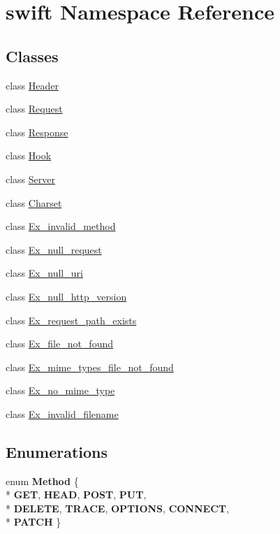 \hypertarget{namespaceswift}{\section{swift Namespace Reference}
\label{namespaceswift}
}
\subsection*{Classes}
\begin{DoxyCompactItemize}
\item 
class \hyperlink{classswift_1_1_header}{Header}
\item 
class \hyperlink{classswift_1_1_request}{Request}
\item 
class \hyperlink{classswift_1_1_response}{Response}
\item 
class \hyperlink{classswift_1_1_hook}{Hook}
\item 
class \hyperlink{classswift_1_1_server}{Server}
\item 
class \hyperlink{classswift_1_1_charset}{Charset}
\item 
class \hyperlink{classswift_1_1_ex__invalid__method}{Ex\-\_\-invalid\-\_\-method}
\item 
class \hyperlink{classswift_1_1_ex__null__request}{Ex\-\_\-null\-\_\-request}
\item 
class \hyperlink{classswift_1_1_ex__null__uri}{Ex\-\_\-null\-\_\-uri}
\item 
class \hyperlink{classswift_1_1_ex__null__http__version}{Ex\-\_\-null\-\_\-http\-\_\-version}
\item 
class \hyperlink{classswift_1_1_ex__request__path__exists}{Ex\-\_\-request\-\_\-path\-\_\-exists}
\item 
class \hyperlink{classswift_1_1_ex__file__not__found}{Ex\-\_\-file\-\_\-not\-\_\-found}
\item 
class \hyperlink{classswift_1_1_ex__mime__types__file__not__found}{Ex\-\_\-mime\-\_\-types\-\_\-file\-\_\-not\-\_\-found}
\item 
class \hyperlink{classswift_1_1_ex__no__mime__type}{Ex\-\_\-no\-\_\-mime\-\_\-type}
\item 
class \hyperlink{classswift_1_1_ex__invalid__filename}{Ex\-\_\-invalid\-\_\-filename}
\end{DoxyCompactItemize}
\subsection*{Enumerations}
\begin{DoxyCompactItemize}
\item 
enum {\bfseries Method} \{ \\*
{\bfseries G\-E\-T}, 
{\bfseries H\-E\-A\-D}, 
{\bfseries P\-O\-S\-T}, 
{\bfseries P\-U\-T}, 
\\*
{\bfseries D\-E\-L\-E\-T\-E}, 
{\bfseries T\-R\-A\-C\-E}, 
{\bfseries O\-P\-T\-I\-O\-N\-S}, 
{\bfseries C\-O\-N\-N\-E\-C\-T}, 
\\*
{\bfseries P\-A\-T\-C\-H}
 \}
\end{DoxyCompactItemize}

